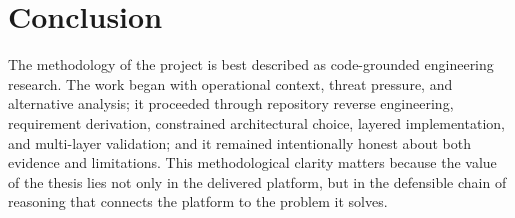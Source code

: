 \section*{Conclusion}
The methodology of the project is best described as code-grounded engineering research. The work began with operational context, threat pressure, and alternative analysis; it proceeded through repository reverse engineering, requirement derivation, constrained architectural choice, layered implementation, and multi-layer validation; and it remained intentionally honest about both evidence and limitations. This methodological clarity matters because the value of the thesis lies not only in the delivered platform, but in the defensible chain of reasoning that connects the platform to the problem it solves.
